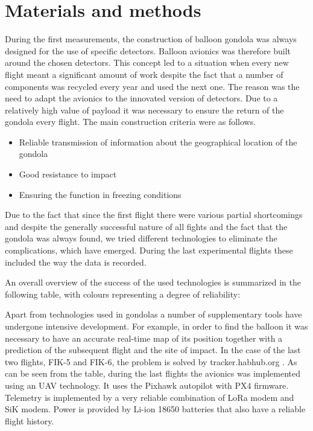 \documentclass{Rpd}
\begin{document}
\section{Materials and methods}

During the first measurements, the construction of balloon gondola was always designed for the use of specific detectors. Balloon avionics was therefore built around the chosen detectors.
This concept led to a situation when every new flight meant a significant amount of work despite the fact that a number of components was recycled every year and used the next one. The reason was the need to adapt the avionics to the innovated version of detectors. Due to a relatively high value of payload it was necessary to ensure the return of the gondola every flight. The main construction criteria were as follows.

\begin{itemize}
\item Reliable transmission of information about the geographical location of the gondola
\item Good resistance to impact
\item Ensuring the function in freezing conditions
\end{itemize}



Due to the fact that since the first flight there were various partial shortcomings and despite the generally successful nature of all fights and the fact that the gondola was always found, we tried different technologies to eliminate the complications, which have emerged. During the last experimental flights these included the way the data is recorded.

An overall overview of the success of the used technologies is summarized in the following table, with colours representing a degree of reliability:



Apart from technologies used in gondolas a number of supplementary tools have undergone intensive development. For example, in order to find the balloon it was necessary to have an accurate real-time map of its position together with a prediction of the subsequent flight and the site of impact. In the case of the last two flights, FIK-5 and FIK-6, the problem is solved by tracker.habhub.org .
As can be seen from the table, during the last flights the avionics was implemented using an UAV technology. It uses the Pixhawk autopilot with PX4 firmware. Telemetry is implemented by a very reliable combination of LoRa modem and SiK modem. Power is provided by Li-ion 18650 batteries that also have a reliable flight history.
\end{document}
